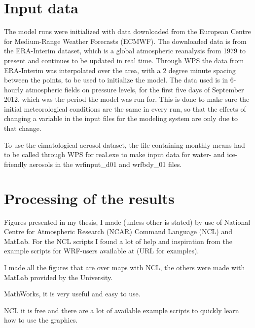 \section{Input data}
\label{sec:inputdata}
The model runs were initialized with data downloaded from the European Centre for Medium-Range Weather Forecasts (ECMWF).%
The downloaded data is from the ERA-Interim dataset, which is a global atmospheric reanalysis from 1979 to present and continues to be updated in real time.%
Through WPS the data from ERA-Interim was interpolated over the area, with a 2 degree minute spacing between the points, to be used to initialize the model. The data used is in 6-hourly atmospheric fields on pressure levels, for the first five days of September 2012, which was the period the model was run for. This is done to make sure the initial meteorological conditions are the same in every run, so that the effects of changing a variable in the input files for the modeling system are only due to that change.

To use the cimatological aerosol dataset, the file containing monthly means had to be called through WPS for real.exe to make input data for water- and ice-friendly aerosols in the wrfinput\_d01 and wrfbdy\_01 files.

\section{Processing of the results}
Figures presented in my thesis, I made (unless other is stated) by use of National Centre for Atmospheric Research (NCAR) Command Language (NCL) and MatLab. For the NCL scripts I found a lot of help and inspiration from the example scripts for WRF-users available at (URL for examples).

I made all the figures that are over maps with NCL, the others were made with MatLab provided by the University.

MathWorks, it is very useful and easy to use.

NCL it is free and there are a lot of available example scripts to quickly learn how to use the graphics.